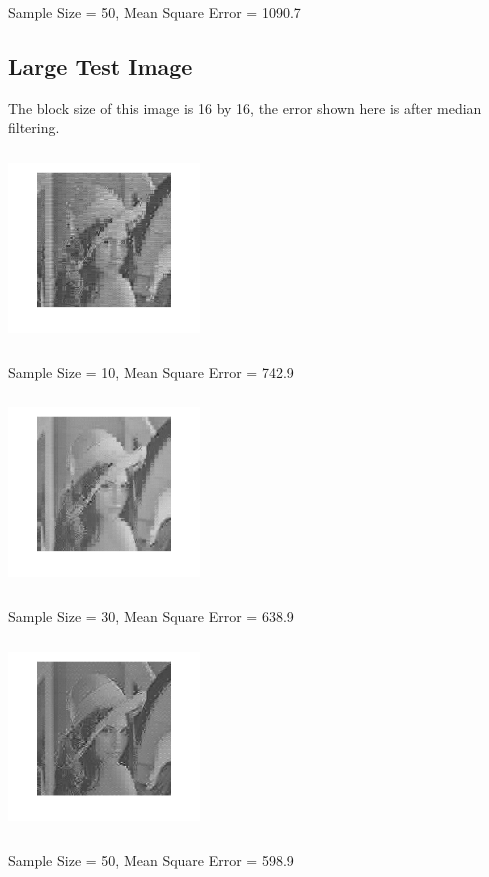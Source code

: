 \documentclass{article}
\begin{document}
Sample Size = 50, Mean Square Error = 1090.7

\subsection{Large Test Image}
The block size of this image is 16 by 16, the error shown here is after median filtering.

\includegraphics[width=2in,height=2in]{2-10.png}
\vspace{-0.1in}

Sample Size = 10, Mean Square Error = 742.9

\includegraphics[width=2in,height=2in]{2-30.png}
\vspace{-0.1in}

Sample Size = 30, Mean Square Error = 638.9
 
\includegraphics[width=2in,height=2in]{2-50.png}
\vspace{-0.1in}

Sample Size = 50, Mean Square Error = 598.9
\end{document}
